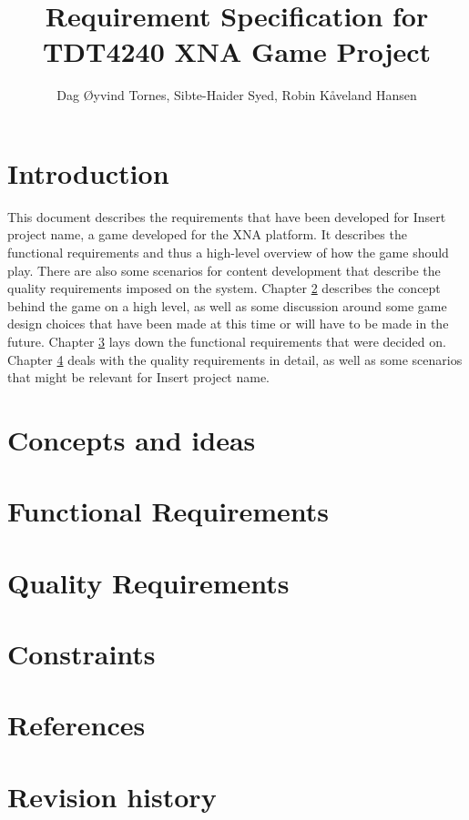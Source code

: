 \documentclass[a4paper,11pt]{article}
\author{Dag Øyvind Tornes, Sibte-Haider Syed, Robin Kåveland Hansen}
\title{Requirement Specification for TDT4240 XNA Game Project}
\def \project {Insert project name}
\begin{document}
\maketitle

\clearpage

\tableofcontents

\clearpage

\section{Introduction}
This document describes the requirements that have been developed for \project,
a game developed for the XNA platform. It describes the functional requirements
and thus a high-level overview of how the game should play. There are also some
scenarios for content development that describe the quality requirements imposed
on the system. Chapter \ref{concepts} describes the concept behind the game on
a high level, as well as some discussion around some game design choices that
have been made at this time or will have to be made in the future. Chapter
\ref{funcreq} lays down the functional requirements that were decided on.
Chapter \ref{qualreq} deals with the quality requirements in detail, as well as
some scenarios that might be relevant for \project.

\section{Concepts and ideas}
\label{concepts}

\section{Functional Requirements}
\label{funcreq}







% 

\section{Quality Requirements}
\label{qualreq}

\section{Constraints}
\label{constraints}

\section{References}


\section{Revision history}
\end{document}
